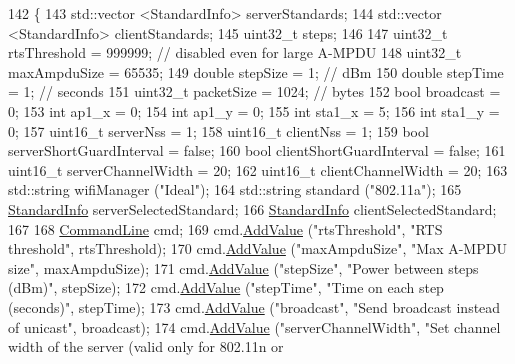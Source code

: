 \begin{DoxyCode}
142 \{
143   std::vector <StandardInfo> serverStandards;
144   std::vector <StandardInfo> clientStandards;
145   uint32\_t steps;
146 
147   uint32\_t rtsThreshold = 999999;  \textcolor{comment}{// disabled even for large A-MPDU}
148   uint32\_t maxAmpduSize = 65535;
149   \textcolor{keywordtype}{double} stepSize = 1; \textcolor{comment}{// dBm}
150   \textcolor{keywordtype}{double} stepTime = 1; \textcolor{comment}{// seconds}
151   uint32\_t packetSize = 1024; \textcolor{comment}{// bytes}
152   \textcolor{keywordtype}{bool} broadcast = 0;
153   \textcolor{keywordtype}{int} ap1\_x = 0;
154   \textcolor{keywordtype}{int} ap1\_y = 0;
155   \textcolor{keywordtype}{int} sta1\_x = 5;
156   \textcolor{keywordtype}{int} sta1\_y = 0;
157   uint16\_t serverNss = 1;
158   uint16\_t clientNss = 1;
159   \textcolor{keywordtype}{bool} serverShortGuardInterval = \textcolor{keyword}{false};
160   \textcolor{keywordtype}{bool} clientShortGuardInterval = \textcolor{keyword}{false};
161   uint16\_t serverChannelWidth = 20;
162   uint16\_t clientChannelWidth = 20;
163   std::string wifiManager (\textcolor{stringliteral}{"Ideal"});
164   std::string standard (\textcolor{stringliteral}{"802.11a"});
165   \hyperlink{structStandardInfo}{StandardInfo} serverSelectedStandard;
166   \hyperlink{structStandardInfo}{StandardInfo} clientSelectedStandard;
167 
168   \hyperlink{classns3_1_1CommandLine}{CommandLine} cmd;
169   cmd.\hyperlink{classns3_1_1CommandLine_addcfb546c7ad4c8bd0965654d55beb8e}{AddValue} (\textcolor{stringliteral}{"rtsThreshold"}, \textcolor{stringliteral}{"RTS threshold"}, rtsThreshold);
170   cmd.\hyperlink{classns3_1_1CommandLine_addcfb546c7ad4c8bd0965654d55beb8e}{AddValue} (\textcolor{stringliteral}{"maxAmpduSize"}, \textcolor{stringliteral}{"Max A-MPDU size"}, maxAmpduSize);
171   cmd.\hyperlink{classns3_1_1CommandLine_addcfb546c7ad4c8bd0965654d55beb8e}{AddValue} (\textcolor{stringliteral}{"stepSize"}, \textcolor{stringliteral}{"Power between steps (dBm)"}, stepSize);
172   cmd.\hyperlink{classns3_1_1CommandLine_addcfb546c7ad4c8bd0965654d55beb8e}{AddValue} (\textcolor{stringliteral}{"stepTime"}, \textcolor{stringliteral}{"Time on each step (seconds)"}, stepTime);
173   cmd.\hyperlink{classns3_1_1CommandLine_addcfb546c7ad4c8bd0965654d55beb8e}{AddValue} (\textcolor{stringliteral}{"broadcast"}, \textcolor{stringliteral}{"Send broadcast instead of unicast"}, broadcast);
174   cmd.\hyperlink{classns3_1_1CommandLine_addcfb546c7ad4c8bd0965654d55beb8e}{AddValue} (\textcolor{stringliteral}{"serverChannelWidth"}, \textcolor{stringliteral}{"Set channel width of the server (valid only for 802.11n or
}
\end{DoxyCode}
